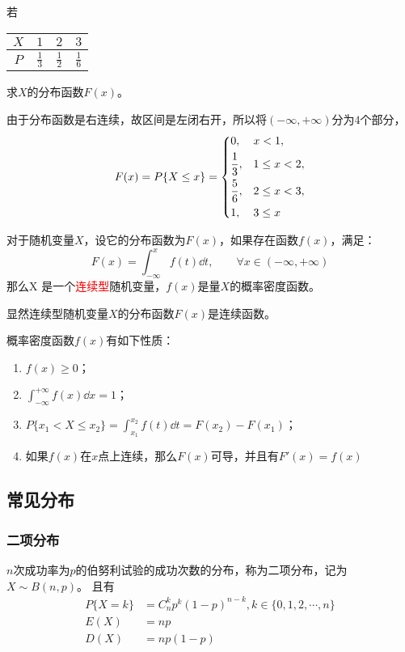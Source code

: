 \begin{example}
    若
    \begin{tabular}{c|ccc}
        $X$ & $1$           & $2$           & $3$           \\ \hline
        $P$ & $\frac{1}{3}$ & $\frac{1}{2}$ & $\frac{1}{6}$
    \end{tabular}
    求$X$的分布函数$F(x)$。
\end{example}
\begin{solution}
    由于分布函数是右连续，故区间是左闭右开，所以将$(-\infty,+\infty)$分为$4$个部分，
    \[
        F(x) = P\{ X\leq x \}
        =
        \begin{dcases}
            0,           & x< 1,        \\
            \frac{1}{3}, & 1\leq x < 2, \\
            \frac{5}{6}, & 2\leq x < 3, \\
            1 ,          & 3\leq x
        \end{dcases}
    \]
\end{solution}

\begin{definition}
    对于随机变量$X$，设它的分布函数为$F(x)$，如果存在函数$f(x)$，满足：
    \[ F(x) = \int_{-\infty}^x f(t)\dd{t}, \qquad \forall x \in (-\infty,+\infty) \]
    那么X 是一个\textcolor{red}{连续型}随机变量，$f(x)$是量$X$的概率密度函数。
\end{definition}
显然连续型随机变量$X$的分布函数$F(x)$是连续函数。

概率密度函数$f(x)$有如下性质：
\begin{enumerate}[(1)]
    \item $f(x)\geq 0$；
    \item $\displaystyle \int_{-\infty}^{+\infty} f(x)\dd{x} = 1$；
    \item $\displaystyle P\{ x_1< X \leq x_2 \} = \int_{x_1}^{x_2} f(t)\dd{t} = F(x_2)-F(x_1)$；
    \item 如果$f(x)$在$x$点上连续，那么$F(x)$可导，并且有$F'(x)=f(x)$
\end{enumerate}

\subsection{常见分布}
\subsubsection{二项分布}
$n$次成功率为$p$的伯努利试验的成功次数的分布，称为二项分布，记为$X\sim B(n,p)$。
且有
\begin{align}
    P\{ X=k \} & = C_n^k p^k(1-p)^{n-k}, k\in\{0,1,2,\cdots,n\} \label{eq:二项分布律} \\
    E(X)       & = np \label{eq:二项分布期望}                                         \\
    D(X)       & = np(1-p) \label{eq:二项分布方差}
\end{align}

